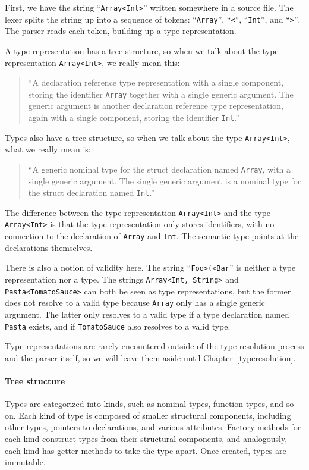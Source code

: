 \documentclass[a4paper,headsepline,bibliography=totoc,toc=flat,fleqn,twoside=semi]{scrbook}
\theoremstyle{definition}
\theoremstyle{definition}
\theoremstyle{definition}
\begin{document}
First, we have the string ``\texttt{Array<Int>}'' written somewhere in a source file. The lexer splits the string up into a sequence of tokens: ``\texttt{Array}'', ``\texttt{<}'', ``\texttt{Int}'', and ``\texttt{>}''. The parser reads each token, building up a type representation.

A type representation has a tree structure, so when we talk about the type representation \texttt{Array<Int>}, we really mean this:
\begin{quote}
``A declaration reference type representation with a single component, storing the identifier \texttt{Array} together with a single generic argument. The generic argument is another declaration reference type representation, again with a single component, storing the identifier \texttt{Int}.''
\end{quote}
Types also have a tree structure, so when we talk about the type \texttt{Array<Int>}, what we really mean is:
\begin{quote}
``A generic nominal type for the struct declaration named \texttt{Array}, with a single generic argument. The single generic argument is a nominal type for the struct declaration named \texttt{Int}.''
\end{quote}
The difference between the type representation \texttt{Array<Int>} and the type \texttt{Array<Int>} is that the type representation only stores identifiers, with no connection to the declaration of \texttt{Array} and \texttt{Int}. The semantic type points at the declarations themselves.

There is also a notion of validity here. The string ``\texttt{Foo>(<Bar}'' is neither a type representation nor a type. The strings \texttt{Array<Int, String>} and \texttt{Pasta<TomatoSauce>} can both be seen as type representations, but the former does not resolve to a valid type because \texttt{Array} only has a single generic argument. The latter only resolves to a valid type if a type declaration named \texttt{Pasta} exists, and if \texttt{TomatoSauce} also resolves to a valid type.

Type representations are rarely encountered outside of the type resolution process and the parser itself, so we will leave them aside until Chapter~\ref{typeresolution}.

\paragraph{Tree structure} Types are categorized into kinds, such as nominal types, function types, and so on. Each kind of type is composed of smaller structural components, including other types, pointers to declarations, and various attributes. Factory methods for each kind construct types from their structural components, and analogously, each kind has getter methods to take the type apart. Once created, types are immutable.
\end{document}
